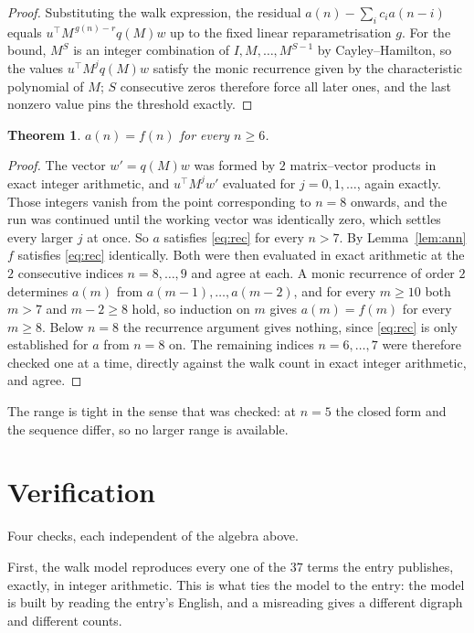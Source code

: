 \documentclass[11pt,a4paper]{article}
\theoremstyle{plain}
\newtheorem{theorem}{Theorem}
\theoremstyle{definition}
\begin{document}
\begin{proof}
Substituting the walk expression, the residual $a(n)-\sum_ic_ia(n-i)$ equals
$u^{\!\top}M^{\,g(n)-r}q(M)w$ up to the fixed linear reparametrisation $g$. For the bound,
$M^{S}$ is an integer combination of $I,M,\dots,M^{S-1}$ by Cayley--Hamilton, so the values
$u^{\!\top}M^{j}q(M)w$ satisfy the monic recurrence given by the characteristic polynomial of
$M$; $S$ consecutive zeros therefore force all later ones, and the last nonzero value pins the
threshold exactly.
\end{proof}

\begin{theorem}
$a(n)=f(n)$ for every $n\ge6$.
\end{theorem}

\begin{proof}
The vector $w'=q(M)w$ was formed by $2$ matrix--vector products in exact integer
arithmetic, and $u^{\!\top}M^{j}w'$ evaluated for $j=0,1,\dots$, again exactly. Those integers
vanish from the point corresponding to $n=8$ onwards, and the run was continued until the
working vector was identically zero, which settles every larger $j$ at once. So $a$ satisfies
\eqref{eq:rec} for every $n>7$. By Lemma~\ref{lem:ann} $f$ satisfies \eqref{eq:rec}
identically. Both were then evaluated in exact arithmetic at the $2$ consecutive indices
$n=8,\dots,9$ and agree at each. A monic recurrence of order $2$
determines $a(m)$ from $a(m-1),\dots,a(m-2)$, and for every $m\ge10$ both
$m>7$ and $m-2\ge8$ hold, so induction on $m$ gives $a(m)=f(m)$ for every
$m\ge8$.
Below $n=8$ the recurrence argument gives nothing, since \eqref{eq:rec} is only
established for $a$ from $n=8$ on. The remaining indices $n=6,\dots,7$ were
therefore checked one at a time, directly against the walk count in exact integer arithmetic,
and agree.
\end{proof}

The range is tight in the sense that was checked: at $n=5$ the closed form and the sequence differ, so no larger range is available.

\section{Verification}

Four checks, each independent of the algebra above.

First, the walk model reproduces every one of the $37$ terms the entry publishes,
exactly, in integer arithmetic. This is what ties the model to the entry: the model is built
by reading the entry's English, and a misreading gives a different digraph and different
counts.
\end{document}
